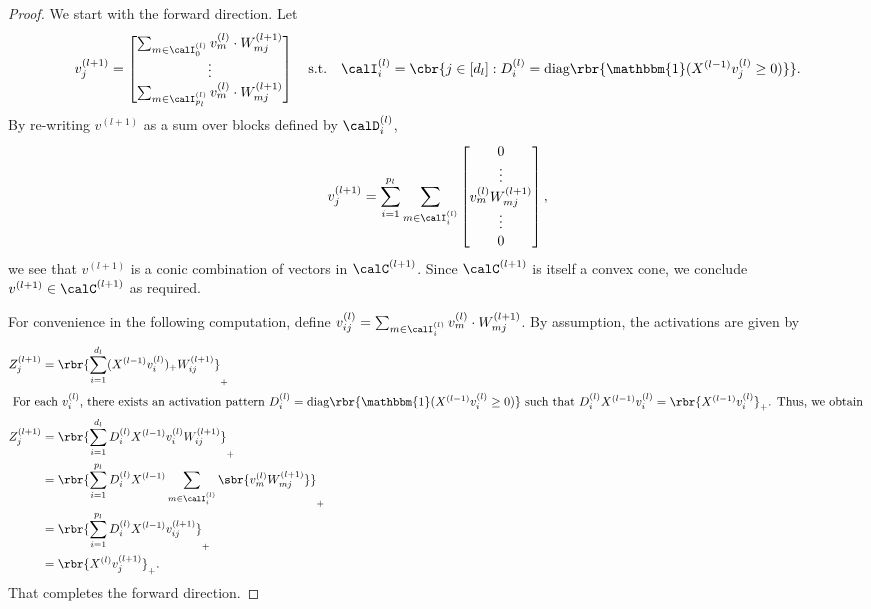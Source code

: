 \documentclass{article}
\newcommand{\Dl}{D^{(l)}}
\newcommand{\calDl}{\calD^{(l)}}
\begin{document}
\begin{proof}
    We start with the forward direction.
    Let
    \begin{equation}
        v^{(l+1)}_{j} =
        \begin{bmatrix}
            \sum_{m \in \calI^{(l)}_0} v^{(l)}_{m} \cdot W_{mj}^{(l+1)} \\
            \vdots                                                      \\
            \sum_{m \in \calI^{(l)}_{p_l}} v^{(l)}_{m} \cdot W_{m j}^{(l+1)}
        \end{bmatrix}
        \quad \text{s.t.} \quad
        \calI^{(l)}_{i} = \cbr{j \in [d_l] :
            \Dl_i = \text{diag}\rbr{\mathbbm{1}(X^{(l-1)} v^{(l)}_j
                \geq 0)}}.
    \end{equation}
    By re-writing \( v^{(l+1)} \) as a sum over blocks defined by \( \calDl_i \),
    \[
        v^{(l+1)}_{j} = \sum_{i=1}^{p_l}
        \sum_{m \in \calI_i^{(l)}}
        \begin{bmatrix}
            0                        \\
            \vdots                   \\
            v_m^{(l)} W_{mj}^{(l+1)} \\
            \vdots                   \\
            0
        \end{bmatrix},
    \]
    we see that \( v^{(l+1)} \) is a conic combination of vectors in \( \calC^{(l+1)} \).
    Since \( \calC^{(l+1)} \) is itself a convex cone, we conclude
    \( v^{(l+1)} \in \calC^{(l+1)} \) as required.

    For convenience in the following computation, define
    \( v_{ij}^{(l)} = \sum_{m \in \calI^{(l)}_i} v^{(l)}_{m} \cdot W_{mj}^{(l+1)} \).
    By assumption, the activations are given by
    \begin{align*}
        Z_{j}^{(l+1)}
         & = \rbr{\sum_{i = 1}^{d_{l}} (X^{(l-1)} v^{(l)}_i)_+
        W_{ij}^{(l+1)}}_+                                                \\
        \intertext{
            For each \( v^{(l)}_i \), there exists an
            activation pattern
            \( \Dl_i = \text{diag}\rbr{\mathbbm{1}(X^{(l-1)} v^{(l)}_i \geq 0)} \)
            such that \( \Dl_i X^{(l-1)} v^{(l)}_i = \rbr{X^{(l-1)} v^{(l)}_i}_+ \).
            Thus, we obtain
        }
        Z_{j}^{(l+1)}
         & = \rbr{\sum_{i = 1}^{d_{l}} \Dl_i X^{(l-1)}
        v^{(l)}_i W_{ij}^{(l+1)}}_+                                      \\
         & = \rbr{\sum_{i = 1}^{p_{l}} \Dl_i X^{(l-1)}
        \sum_{m \in \calI^{(l)}_{i}} \sbr{v^{(l)}_m W_{mj}^{(l+1)}}}_+   \\
         & = \rbr{\sum_{i = 1}^{p_{l}} \Dl_i X^{(l-1)} v^{(l+1)}_{ij}}_+ \\
         & = \rbr{X^{(l)} v^{(l+1)}_{j}}_+.
    \end{align*}
    That completes the forward direction.


\end{proof}
\end{document}

